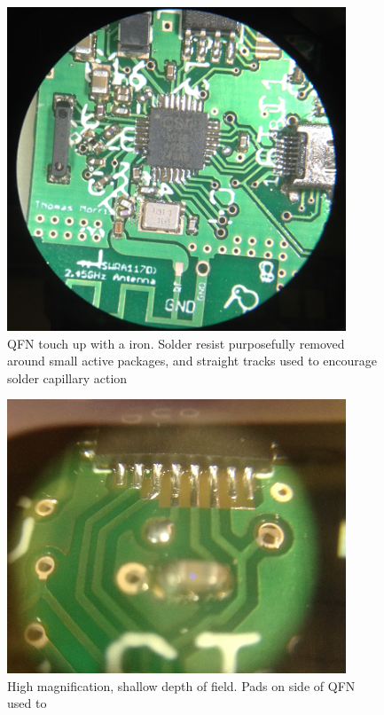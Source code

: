 \documentclass[]{article}
\begin{document}
\begin{figure}[htb]
	\begin{center}
		\includegraphics[width = 0.9\textwidth]{center}
	\end{center}
	\caption{\ac{QFN} touch up with a iron. Solder resist purposefully removed around small active packages, and straight tracks used to encourage solder capillary action}
	\label{fig:center}
\end{figure} 

\begin{figure}[htb]
	\begin{center}
		\includegraphics[width = 0.9\textwidth]{side}
	\end{center}
	\caption{High magnification, shallow depth of field. Pads on side of \ac{QFN} used to}
	\label{fig:side}
\end{figure} 
\end{document}
